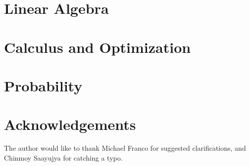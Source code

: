 \documentclass{article}
\begin{document}
\newpage
\section{Linear Algebra}


\newpage
\section{Calculus and Optimization}


\newpage
\section{Probability}


\newpage
\section*{Acknowledgements}
The author would like to thank Michael Franco for suggested clarifications, and Chinmoy Saayujya for catching a typo.



\nocite{*}
\end{document}
